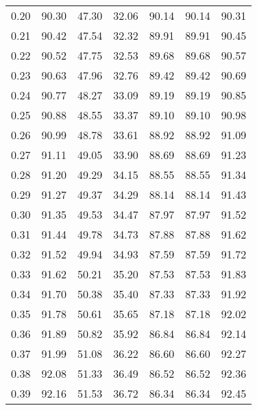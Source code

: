 \begin{tabular}{|c|c|c|c|c|c|c|}
      0.20 &     90.30 &     47.30 &      32.06 &   90.14 &      90.14 &         90.31 \\
      0.21 &     90.42 &     47.54 &      32.32 &   89.91 &      89.91 &         90.45 \\
      0.22 &     90.52 &     47.75 &      32.53 &   89.68 &      89.68 &         90.57 \\
      0.23 &     90.63 &     47.96 &      32.76 &   89.42 &      89.42 &         90.69 \\
      0.24 &     90.77 &     48.27 &      33.09 &   89.19 &      89.19 &         90.85 \\
      0.25 &     90.88 &     48.55 &      33.37 &   89.10 &      89.10 &         90.98 \\
      0.26 &     90.99 &     48.78 &      33.61 &   88.92 &      88.92 &         91.09 \\
      0.27 &     91.11 &     49.05 &      33.90 &   88.69 &      88.69 &         91.23 \\
      0.28 &     91.20 &     49.29 &      34.15 &   88.55 &      88.55 &         91.34 \\
      0.29 &     91.27 &     49.37 &      34.29 &   88.14 &      88.14 &         91.43 \\
      0.30 &     91.35 &     49.53 &      34.47 &   87.97 &      87.97 &         91.52 \\
      0.31 &     91.44 &     49.78 &      34.73 &   87.88 &      87.88 &         91.62 \\
      0.32 &     91.52 &     49.94 &      34.93 &   87.59 &      87.59 &         91.72 \\
      0.33 &     91.62 &     50.21 &      35.20 &   87.53 &      87.53 &         91.83 \\
      0.34 &     91.70 &     50.38 &      35.40 &   87.33 &      87.33 &         91.92 \\
      0.35 &     91.78 &     50.61 &      35.65 &   87.18 &      87.18 &         92.02 \\
      0.36 &     91.89 &     50.82 &      35.92 &   86.84 &      86.84 &         92.14 \\
      0.37 &     91.99 &     51.08 &      36.22 &   86.60 &      86.60 &         92.27 \\
      0.38 &     92.08 &     51.33 &      36.49 &   86.52 &      86.52 &         92.36 \\
      0.39 &     92.16 &     51.53 &      36.72 &   86.34 &      86.34 &         92.45 \\

\end{tabular}
